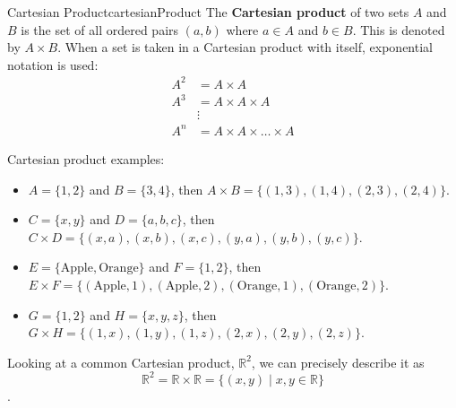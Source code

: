 \begin{definition}{Cartesian Product}{cartesianProduct}
  The \textbf{Cartesian product} of two sets \( A \) and \( B \) is the set of all
  ordered pairs \( (a, b) \) where \( a \in A \) and \( b \in B \). This is denoted by
  \( A \times B \).
  \medskip
  When a set is taken in a Cartesian product with itself, exponential notation is used:
  \begin{align*}
    A^2 &= A \times A \\
    A^3 &= A \times A \times A \\
    &\vdots \\
    A^n &= A \times A \times \ldots \times A
  \end{align*}
\end{definition}
Cartesian product examples:
\begin{itemize}
  \item \( A = \{ 1, 2 \} \) and \( B = \{ 3, 4 \} \), then
    \( A \times B = \{ (1, 3), (1, 4), (2, 3), (2, 4) \} \).
  \item \( C = \{ x, y \} \) and \( D = \{ a, b, c \} \),
    then \( C \times D = \{ (x, a), (x, b), (x, c), (y, a), (y, b), (y, c) \} \).
  \item \( E = \{ \text{Apple}, \text{Orange} \} \)
     and \( F = \{ 1, 2 \} \), then \\
     \( E \times F = \{ (\text{Apple}, 1), (\text{Apple}, 2), (\text{Orange}, 1), (\text{Orange}, 2) \} \).
  \item \( G = \{ 1, 2 \} \) and \( H = \{ x, y, z \} \), then \( G \times H = \{ (1, x), (1, y), (1, z), (2, x), (2, y), (2, z) \} \).
\end{itemize}

Looking at a common Cartesian product, \( \mathbb{R}^2 \), we can precisely describe it
as
\[
  \mathbb{R}^2 = \mathbb{R} \times \mathbb{R} = \{ (x, y) \mid x, y \in \mathbb{R} \}
\].

